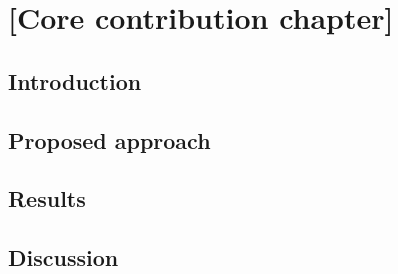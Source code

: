 \chapter{[Core contribution chapter]}
\label{chap:contribution-1}


\section{Introduction}

\section{Proposed approach}

\section{Results}

\section{Discussion}
